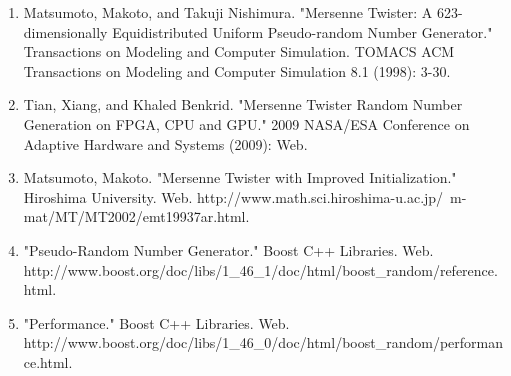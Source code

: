 \documentclass[12pt,a4paper]{article}
\begin{document}
\begin{enumerate}
  \item Matsumoto, Makoto, and Takuji Nishimura. "Mersenne Twister: A 623-dimensionally Equidistributed Uniform Pseudo-random Number Generator." Transactions on Modeling and Computer Simulation. TOMACS ACM Transactions on Modeling and Computer Simulation 8.1 (1998): 3-30.
  \item Tian, Xiang, and Khaled Benkrid. "Mersenne Twister Random Number Generation on FPGA, CPU and GPU." 2009 NASA/ESA Conference on Adaptive Hardware and Systems (2009): Web.
  \item Matsumoto, Makoto. "Mersenne Twister with Improved Initialization." Hiroshima University. Web. http://www.math.sci.hiroshima-u.ac.jp/~m-mat/MT/MT2002/emt19937ar.html.
  \item "Pseudo-Random Number Generator." Boost C++ Libraries. Web. \\ http://www.boost.org/doc/libs/1{\_}46{\_}1/doc/html/boost{\_}random/reference.html.
  \item "Performance." Boost C++ Libraries. Web. \\ http://www.boost.org/doc/libs/1{\_}46{\_}0/doc/html/boost{\_}random/performance.html.   
\end{enumerate}
\end{document}
